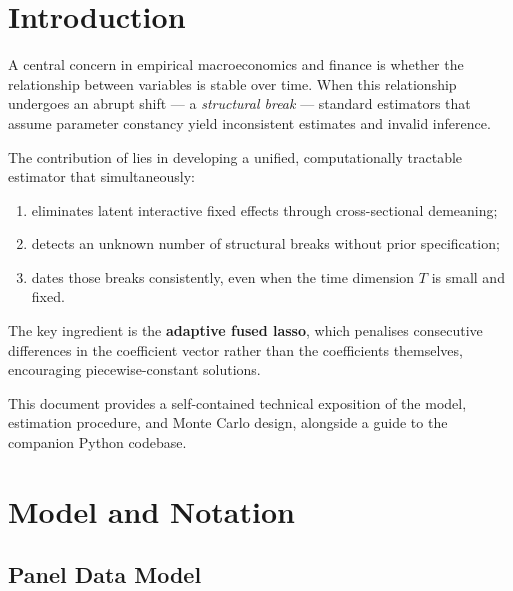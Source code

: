 \documentclass[12pt, a4paper]{article}
\theoremstyle{plain}
\theoremstyle{definition}
\theoremstyle{remark}
\begin{document}
\begin{onehalfspacing}

\section{Introduction}

A central concern in empirical macroeconomics and finance is whether the
relationship between variables is stable over time.
When this relationship undergoes an abrupt shift --- a \emph{structural break}
--- standard estimators that assume parameter constancy yield inconsistent
estimates and invalid inference.

The contribution of \citet{kaddoura2023estimation} lies in developing a
unified, computationally tractable estimator that simultaneously:
\begin{enumerate}[noitemsep]
  \item eliminates latent interactive fixed effects through cross-sectional
        demeaning;
  \item detects an unknown number of structural breaks without prior
        specification;
  \item dates those breaks consistently, even when the time dimension $T$
        is small and fixed.
\end{enumerate}
The key ingredient is the \textbf{adaptive fused lasso}, which penalises
consecutive differences in the coefficient vector rather than the coefficients
themselves, encouraging piecewise-constant solutions.

This document provides a self-contained technical exposition of the model,
estimation procedure, and Monte Carlo design, alongside a guide to the
companion Python codebase.

\section{Model and Notation}
\label{sec:model}

\subsection{Panel Data Model}
\label{sub:panel}


\end{onehalfspacing}
\end{document}
